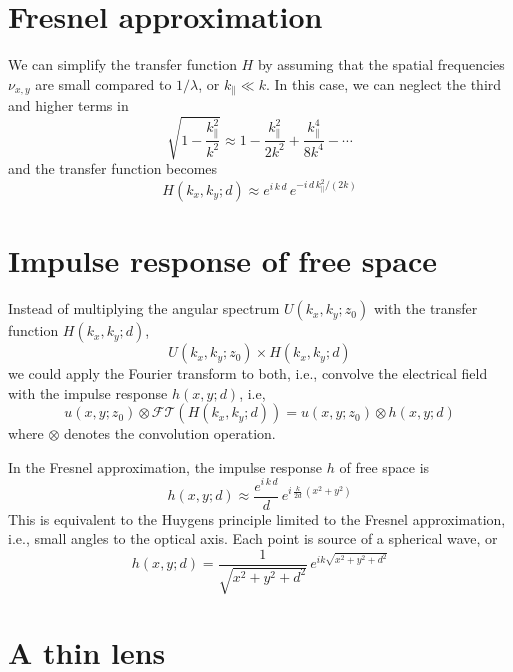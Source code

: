 \section{Fresnel approximation}

We can simplify the transfer function $H$ by assuming that the spatial frequencies $\nu_{x,y}$ are small compared to $1/\lambda$, or $k_\parallel \ll k$. In this case, we can neglect the third and higher terms in
\begin{equation}
    \sqrt{1 - \frac{k_\parallel^2}{k^2 }} \approx 1   - \frac{k_\parallel^2}{2 k^2 }  + \frac{k_\parallel^4}{8 k^4 } - \cdots
\end{equation}
and the transfer function becomes 
\begin{equation}
    H(k_x, k_y; d) 
    \approx e^{i \, k \, d } \, e^{- i \, d \,  k_\parallel^2 / (2 k )  }
\end{equation}


\section{Impulse response of free space}

Instead of multiplying the angular spectrum  $U(k_x, k_y; z_0)$  with the transfer function $H(k_x, k_y; d)$, 
\begin{equation}
    U(k_x, k_y; z_0) \times H(k_x, k_y; d) 
\end{equation}
we could apply the Fourier transform to both, i.e., convolve the electrical field with the impulse response $ h(x, y; d)$, i.e,
\begin{equation}
    u(x, y; z_0) \otimes \mathcal{FT}( H(k_x, k_y; d)) = 
    u(x, y; z_0) \otimes  h(x, y; d)
\end{equation}
where $\otimes$ denotes the convolution operation.

In the Fresnel approximation, the impulse response $h$ of free space is 
\begin{equation}
    h(x, y; d) \approx \frac{ e^{i \, k \, d }}{ d} \, e^{i \, 
    \frac{k}{2d} \, (x^2 + y^2) }
\end{equation}
This is equivalent to the Huygens principle limited to the Fresnel approximation, i.e., small angles to the optical axis. Each point is source of a spherical wave, or
\begin{equation}
    h(x, y; d) = \frac{1}{\sqrt{x^2 + y^2 + d^2}} \, e^{i k \sqrt{x^2 + y^2 + d^2}}
\end{equation}


\section{A thin lens}

